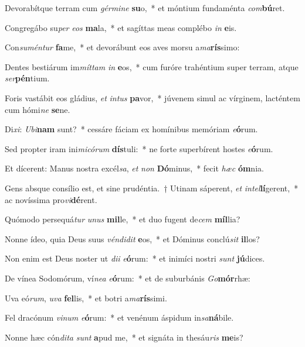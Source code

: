 \item Devorabítque terram cum \textit{gér}\textit{mi}\textit{ne} \textbf{su}o,~* et móntium fundaménta \textit{com}\textbf{bú}ret.
\item Congregábo su\textit{per} \textit{e}\textit{os} \textbf{ma}la,~* et sagíttas meas complébo \textit{in} \textbf{e}is.
\item Con\textit{su}\textit{mén}\textit{tur} \textbf{fa}me,~* et devorábunt eos aves morsu a\textit{ma}\textbf{rís}simo:
\item Dentes bestiárum im\textit{mít}\textit{tam} \textit{in} \textbf{e}os,~* cum furóre trahéntium super terram, atque \textit{ser}\textbf{pén}tium.
\item Foris vastábit eos gládius, \textit{et} \textit{in}\textit{tus} \textbf{pa}vor,~* júvenem simul ac vírginem, lacténtem cum hómi\textit{ne} \textbf{se}ne.
\item Di\textit{xi}: \textit{U}\textit{bi}\textbf{nam} sunt?~* cessáre fáciam ex homínibus memóriam \textit{e}\textbf{ó}rum.
\item Sed propter iram ini\textit{mi}\textit{có}\textit{rum} \textbf{dís}tuli:~* ne forte superbírent hostes \textit{e}\textbf{ó}rum.
\item Et dícerent: Manus nostra excél\textit{sa}, \textit{et} \textit{non} \textbf{Dó}minus,~* fecit \textit{hæc} \textbf{óm}nia.
\item Gens absque consílio est, et sine prudéntia.~† Utinam sáperent, \textit{et} \textit{in}\textit{tel}\textbf{lí}gerent,~* ac novíssima pro\textit{vi}\textbf{dé}rent.
\item Quómodo persequá\textit{tur} \textit{u}\textit{nus} \textbf{mil}le,~* et duo fugent de\textit{cem} \textbf{míl}lia?
\item Nonne ídeo, quia Deus suus \textit{vén}\textit{di}\textit{dit} \textbf{e}os,~* et Dóminus conclú\textit{sit} \textbf{il}los?
\item Non enim est Deus noster ut \textit{di}\textit{i} \textit{e}\textbf{ó}rum:~* et inimíci nostri \textit{sunt} \textbf{jú}dices.
\item De vínea Sodomórum, ví\textit{ne}\textit{a} \textit{e}\textbf{ó}rum:~* et de suburbánis \textit{Go}\textbf{mór}rhæ:
\item Uva eó\textit{rum}, \textit{u}\textit{va} \textbf{fel}lis,~* et botri a\textit{ma}\textbf{rís}simi.
\item Fel dracónum \textit{vi}\textit{num} \textit{e}\textbf{ó}rum:~* et venénum áspidum in\textit{sa}\textbf{ná}bile.
\item Nonne hæc cón\textit{di}\textit{ta} \textit{sunt} \textbf{a}pud me,~* et signáta in thesáu\textit{ris} \textbf{me}is?
